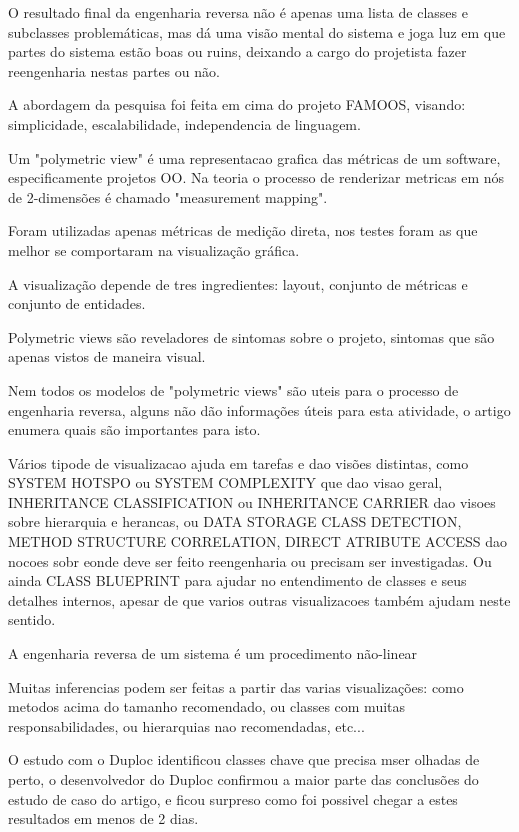 \documentclass[12pt]{article}
\begin{document}
O resultado final da engenharia reversa não é apenas uma lista de classes e subclasses problemáticas, mas dá uma visão mental do sistema e joga luz em que partes do sistema estão boas ou ruins, deixando a cargo do projetista fazer reengenharia nestas partes ou não.

A abordagem da pesquisa foi feita em cima do projeto FAMOOS, visando: simplicidade, escalabilidade, independencia de linguagem.

Um "polymetric view" é uma representacao grafica das métricas de um software, especificamente projetos OO. Na teoria o processo de renderizar metricas em nós de 2-dimensões é chamado "measurement mapping".

Foram utilizadas apenas métricas de medição direta, nos testes foram as que melhor se comportaram na visualização gráfica.

A visualização depende de tres ingredientes: layout, conjunto de métricas e conjunto de entidades.

Polymetric views são reveladores de sintomas sobre o projeto, sintomas que são apenas vistos de maneira visual.

Nem todos os modelos de "polymetric views" são uteis para o processo de engenharia reversa, alguns não dão informações úteis para esta atividade, o artigo enumera quais são importantes para isto.

Vários tipode de visualizacao ajuda em tarefas e dao visões distintas, como SYSTEM HOTSPO ou SYSTEM COMPLEXITY que dao visao geral, INHERITANCE CLASSIFICATION ou INHERITANCE CARRIER dao visoes sobre hierarquia e herancas, ou DATA STORAGE CLASS DETECTION, METHOD STRUCTURE CORRELATION, DIRECT ATRIBUTE ACCESS dao nocoes sobr eonde deve ser feito reengenharia ou precisam ser investigadas. Ou ainda CLASS BLUEPRINT para ajudar no entendimento de classes e seus detalhes internos, apesar de que varios outras visualizacoes também ajudam neste sentido.

A engenharia reversa de um sistema é um procedimento não-linear

Muitas inferencias podem ser feitas a partir das varias visualizações: como metodos acima do tamanho recomendado, ou classes com muitas responsabilidades, ou hierarquias nao recomendadas, etc...

O estudo com o Duploc identificou classes chave que precisa mser olhadas de perto, o desenvolvedor do Duploc confirmou a maior parte das conclusões do estudo de caso do artigo, e ficou surpreso como foi possivel chegar a estes resultados em menos de 2 dias.
\end{document}
